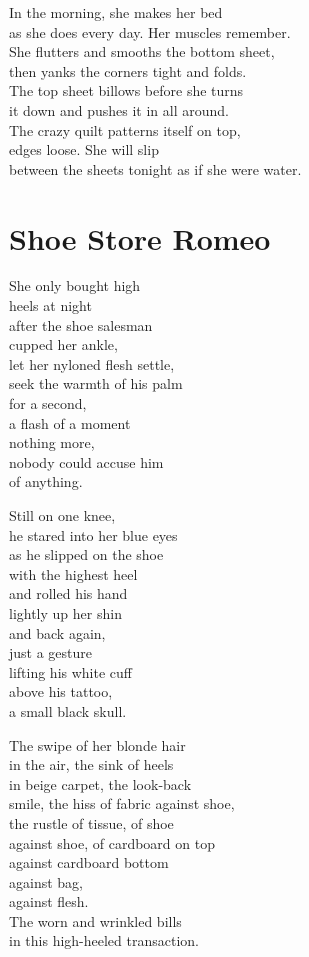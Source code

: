 \documentclass[twoside,10pt]{book}
\begin{document}
In the morning, she makes her bed\\
as she does every day. Her muscles remember.\\
She flutters and smooths the bottom sheet,\\
then yanks the corners tight and folds.\\
The top sheet billows before she turns\\
it down and pushes it in all around.\\
The crazy quilt patterns itself on top,\\
edges loose. She will slip\\
between the sheets tonight as if she were water.


\clearpage
\section{Shoe Store Romeo}

She only bought high\\
heels at night\\
after the shoe salesman\\
cupped her ankle,\\
let her nyloned flesh settle,\\
seek the warmth of his palm\\
for a second,\\
a flash of a moment\\
nothing more,\\
nobody could accuse him\\
of anything.

Still on one knee,\\
he stared into her blue eyes\\
as he slipped on the shoe\\
with the highest heel\\
and rolled his hand\\
lightly up her shin\\
and back again,\\
just a gesture\\
lifting his white cuff\\
above his tattoo,\\
a small black skull.

The swipe of her blonde hair\\
in the air, the sink of heels\\
in beige carpet, the look-back\\
smile, the hiss of fabric against shoe,\\
the rustle of tissue, of shoe\\
against shoe, of cardboard on top\\
against cardboard bottom\\
against bag,\\
against flesh.\\
The worn and wrinkled bills\\
in this high-heeled transaction.
\end{document}

